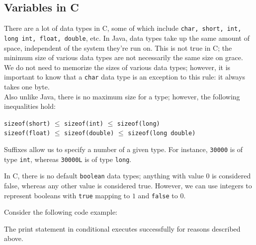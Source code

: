 \subsection{Variables in C}
There are a lot of data types in C, some of which include \verb!char, short, int, long int, float, double!, etc. In Java, data types take up the same amount of space, independent of the system they're run on. This is not true in C; the minimum size of various data types are not necessarily the same size on grace. We do not need to memorize the sizes of various data types; however, it is important to know that a \verb!char! data type is an exception to this rule: it always takes one byte. \\

Also unlike Java, there is no maximum size for a type; however, the following inequalities hold:
\begin{center}
\verb!sizeof(short)! $\leq$ \verb!sizeof(int)! $\leq$ \verb!sizeof(long)! \\[0.7em]
\verb!sizeof(float)! $\leq$ \verb!sizeof(double)! $\leq$ \verb!sizeof(long double)!
\end{center}

Suffixes allow us to specify a number of a given type. For instance, \verb!30000! is of type \verb!int!, whereas \verb!30000L! is of type \verb!long!.



In C, there is no default \verb!boolean! data types; anything with value $0$ is considered false, whereas any other value is considered true. However, we can use integers to represent booleans with \verb!true! mapping to $1$ and \verb!false! to $0$.

Consider the following code example:



\lstset{
caption=Conditional Example
}
\begin{center}

\end{center}

The print statement in conditional executes successfully for reasons described above.











